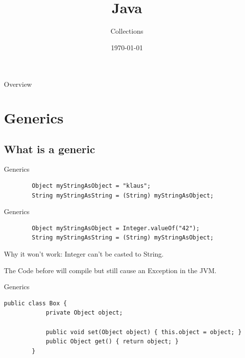 


\title{Java}
\subtitle{Collections}
\date{\today}

\usepackage{color}



\begin{frame}
\titlepage
\end{frame}

\begin{frame}{Overview}
\tableofcontents
\end{frame}

\section{Generics}
\subsection{What is a generic}
\begin{frame}[fragile]{Generics}
	\begin{lstlisting}
		Object myStringAsObject = "klaus";
		String myStringAsString = (String) myStringAsObject;
	\end{lstlisting}
\end{frame}

\begin{frame}[fragile]{Generics}
	\begin{lstlisting}
		Object myStringAsObject = Integer.valueOf("42");
		String myStringAsString = (String) myStringAsObject;
	\end{lstlisting}
\end{frame}

\begin{frame}[fragile]{Why it won't work:}
		Integer can't be casted to String.
		
		The Code before will compile but still cause an Exception in the JVM.
\end{frame}

\begin{frame}[fragile]{Generics}
	\begin{lstlisting}[basicstyle=\ttfamily\scriptsize]
		public class Box {
			private Object object;

			public void set(Object object) { this.object = object; }
			public Object get() { return object; }
		}

	\end{lstlisting}
\end{frame}

